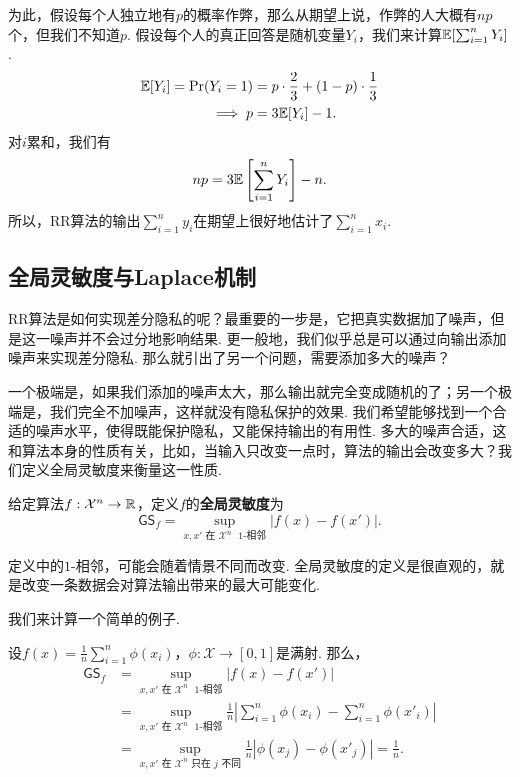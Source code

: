 为此，假设每个人独立地有$p$的概率作弊，那么从期望上说，作弊的人大概有$np$个，但我们不知道$p$. 假设每个人的真正回答是随机变量$Y_i$，我们来计算$\mathbb{E}[\sum_{i=1}^n Y_i]$.
\begin{align*}
    \mathbb{E}[Y_i]=\Pr(Y_i = 1) &= p \cdot \frac23 + (1 - p) \cdot \frac13 \\
    \implies p &= 3\mathbb{E}[Y_i] - 1.
\end{align*}
对$i$累和，我们有
\[
    np=3\mathbb{E}\left[\sum_{i=1}^n Y_i\right] - n.
\]
所以，RR算法的输出$\sum_{i=1}^n y_i$在期望上很好地估计了$\sum_{i=1}^n x_i$.

\subsection{全局灵敏度与Laplace机制}

RR算法是如何实现差分隐私的呢？最重要的一步是，它把真实数据加了噪声，但是这一噪声并不会过分地影响结果. 更一般地，我们似乎总是可以通过向输出添加噪声来实现差分隐私. 那么就引出了另一个问题，需要添加多大的噪声？

一个极端是，如果我们添加的噪声太大，那么输出就完全变成随机的了；另一个极端是，我们完全不加噪声，这样就没有隐私保护的效果. 我们希望能够找到一个合适的噪声水平，使得既能保护隐私，又能保持输出的有用性. 多大的噪声合适，这和算法本身的性质有关，比如，当输入只改变一点时，算法的输出会改变多大？我们定义全局灵敏度来衡量这一性质.

\begin{definition}[全局灵敏度]
给定算法$f: \mathcal X^n \to \mathbb{R}$，定义$f$的\textbf{全局灵敏度}为
    \[
    \mathsf{GS}_f = \sup_{x, x' \text{ 在 }\mathcal X^n\text{ $1$-相邻}} |f(x) - f(x')|. 
    \]
\end{definition}
定义中的$1$-相邻，可能会随着情景不同而改变. 全局灵敏度的定义是很直观的，就是改变一条数据会对算法输出带来的最大可能变化. 

我们来计算一个简单的例子.
\begin{example}
设$f(x)= \frac1n \sum_{i=1}^n \phi(x_i)$，$\phi : \mathcal X\to [0,1]$是满射. 那么，
\begin{align*}
    \mathsf{GS}_f&=\sup_{x, x' \text{ 在 }\mathcal X^n\text{ $1$-相邻}} |f(x) - f(x')|\\
    &= \sup_{x, x' \text{ 在 }\mathcal X^n\text{ $1$-相邻}} \frac1n \left|\sum_{i=1}^n \phi(x_i) - \sum_{i=1}^n \phi(x'_i)\right|\\
    &= \sup_{x, x' \text{ 在 }\mathcal X^n\text{ 只在 } j\text{ 不同}} \frac1n \left|\phi(x_j) - \phi(x'_j)\right| = \frac1n.
\end{align*}
\end{example}

